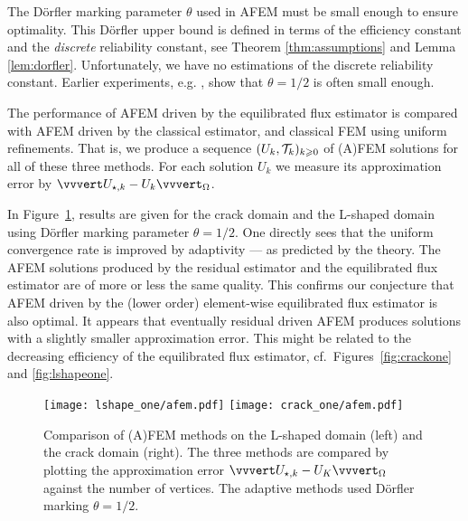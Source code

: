 \documentclass[thesis.tex]{subfiles}
\begin{document}
The D\"orfler marking parameter $\theta$ used in AFEM must be small enough to ensure optimality.
This D\"orfler upper bound is defined in terms of the efficiency constant
and the \emph{discrete} reliability constant, see Theorem \ref{thm:assumptions} and Lemma \ref{lem:dorfler}. Unfortunately,
we have no estimations of the discrete reliability constant. 
Earlier experiments, e.g. \cite{cascon2008}, show that $\theta = 1/2$ is often small enough.

The performance of AFEM driven by the equilibrated flux estimator 
is compared with AFEM driven by the classical estimator, and classical FEM using uniform refinements.
That is, we produce a sequence $(U_k, \mathcal{T}_k)_{k\geqslant0}$ of (A)FEM solutions for all of these three methods.
For each solution $U_k$ we measure its approximation error by $\uaenorm{U_{\star,k} - U_k}_\O$.


In Figure~\ref{fig:afem}, results are given for the crack domain and the L-shaped domain using D\"orfler marking parameter $\theta = 1/2$.
One directly sees that the uniform convergence rate is improved 
by adaptivity --- as predicted by the theory.
 The AFEM solutions produced by the residual estimator and the equilibrated flux estimator
are of more or less the same quality.
This confirms our conjecture that AFEM driven by the (lower order) element-wise equilibrated flux estimator is also optimal.
It appears that eventually residual driven AFEM produces solutions with a slightly
smaller approximation error. This might be related to the decreasing efficiency of the equilibrated flux  estimator,
cf.~Figures~\ref{fig:crackone} and \ref{fig:lshapeone}. 
\begin{figure}
  \centering
  \texttt{[image: lshape\_one/afem.pdf]}
  \texttt{[image: crack\_one/afem.pdf]}
  \caption{Comparison of (A)FEM methods on the L-shaped domain (left) and the crack domain (right). The three methods are
  compared by plotting the approximation error $\uaenorm{U_{\star,k} - U_K}_\O$ against the number of vertices. The adaptive methods
  used D\"orfler marking $\theta = 1/2$.}
  \label{fig:afem}
\end{figure}
\end{document}
